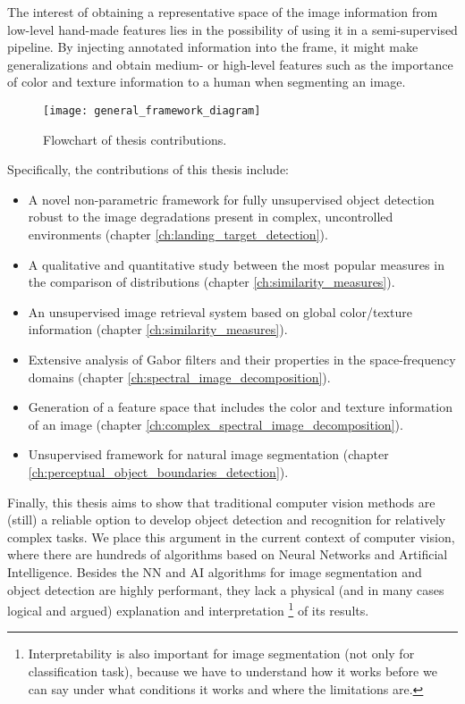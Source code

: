 The interest of obtaining a representative space of the image information from low-level hand-made features lies in the possibility of using it in a semi-supervised pipeline. By injecting annotated information into the frame, it might make generalizations and obtain medium- or high-level features such as the importance of color and texture information to a human when segmenting an image. 

\begin{figure}[!ht]
    \centering
    \texttt{[image: general\_framework\_diagram]}        
    \caption{Flowchart of thesis contributions.}\label{fig:general_diagram_framework}
\end{figure}

Specifically, the contributions of this thesis include:

\begin{itemize}
	\item A novel non-parametric framework for fully unsupervised object detection robust to the image degradations present in complex, uncontrolled environments (chapter \ref{ch:landing_target_detection}).
	\item A qualitative and quantitative study between the most popular measures in the comparison of distributions (chapter \ref{ch:similarity_measures}). 
	\item An unsupervised image retrieval system based on global color/texture information (chapter \ref{ch:similarity_measures}).
	\item Extensive analysis of Gabor filters and their properties in the space-frequency domains (chapter \ref{ch:spectral_image_decomposition}).
	\item Generation of a feature space that includes the color and texture information of an image (chapter \ref{ch:complex_spectral_image_decomposition}).
	\item Unsupervised framework for natural image segmentation (chapter \ref{ch:perceptual_object_boundaries_detection}).
\end{itemize}

Finally, this thesis aims to show that traditional computer vision methods are (still) a reliable option to develop object detection and recognition for relatively complex tasks. We place this argument in the current context of computer vision, where there are hundreds of algorithms based on Neural Networks and Artificial Intelligence. Besides the NN and AI algorithms for image segmentation and object detection are highly performant, they lack a physical (and in many cases logical and argued) explanation and interpretation \footnote{Interpretability is also important for image segmentation (not only for classification task), because we have to understand how it works before we can say under what conditions it works and where the limitations are.} of its results. 



